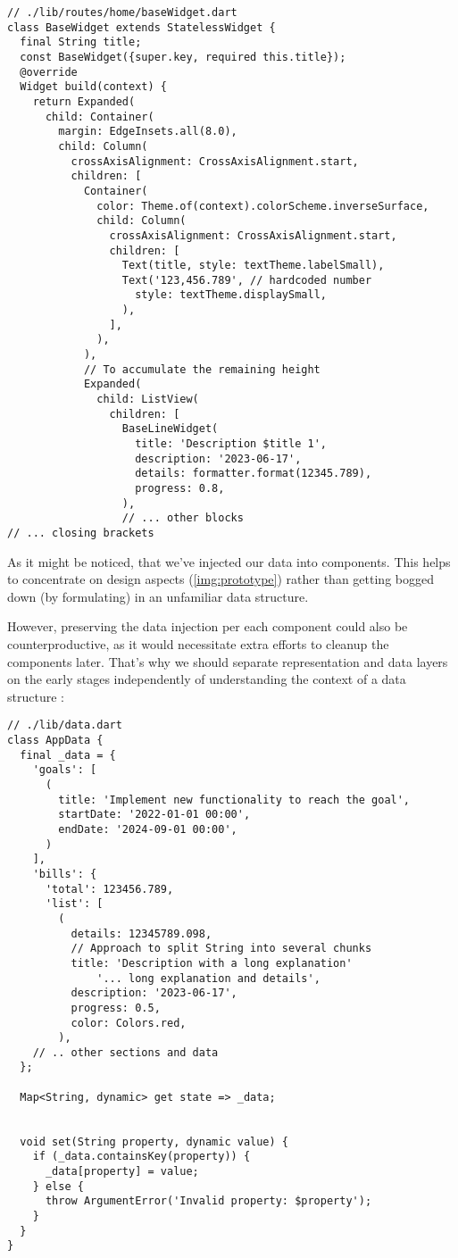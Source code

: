 \begin{lstlisting}
// ./lib/routes/home/baseWidget.dart
class BaseWidget extends StatelessWidget {
  final String title;
  const BaseWidget({super.key, required this.title});
  @override
  Widget build(context) {
    return Expanded(
      child: Container(
        margin: EdgeInsets.all(8.0),
        child: Column(
          crossAxisAlignment: CrossAxisAlignment.start,
          children: [
            Container(
              color: Theme.of(context).colorScheme.inverseSurface,
              child: Column(
                crossAxisAlignment: CrossAxisAlignment.start,
                children: [
                  Text(title, style: textTheme.labelSmall),
                  Text('123,456.789', // hardcoded number
                    style: textTheme.displaySmall,
                  ),
                ],
              ),
            ),
            // To accumulate the remaining height
            Expanded( 
              child: ListView(
                children: [
                  BaseLineWidget(
                    title: 'Description $title 1',
                    description: '2023-06-17',
                    details: formatter.format(12345.789),
                    progress: 0.8,
                  ),
                  // ... other blocks
// ... closing brackets
\end{lstlisting}

\noindent As it might be noticed, that we've injected our data into components. This helps to concentrate on design 
aspects (\cref{img:prototype}) rather than getting bogged down (by formulating) in an unfamiliar data structure. 

However, preserving the data injection per each component could also be counterproductive, as it would necessitate 
extra efforts to cleanup the components later. That's why we should separate representation and data layers on the 
early stages independently of understanding the context of a data structure :

\begin{lstlisting}[caption=Mock Structure of a Financial Data, label=code:app-data]
// ./lib/data.dart
class AppData {
  final _data = {
    'goals': [
      (
        title: 'Implement new functionality to reach the goal',
        startDate: '2022-01-01 00:00',
        endDate: '2024-09-01 00:00',
      )
    ],
    'bills': {
      'total': 123456.789,
      'list': [
        (
          details: 12345789.098,
          // Approach to split String into several chunks
          title: 'Description with a long explanation'
              '... long explanation and details',
          description: '2023-06-17',
          progress: 0.5,
          color: Colors.red,
        ),
    // .. other sections and data
  };

  Map<String, dynamic> get state => _data;


  void set(String property, dynamic value) {
    if (_data.containsKey(property)) {
      _data[property] = value;
    } else {
      throw ArgumentError('Invalid property: $property');
    }
  }
}
\end{lstlisting}

